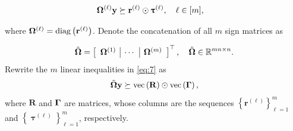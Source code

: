 \documentclass[12pt,draftcls,onecolumn]{IEEEtran}
\begin{document}
\begin{equation}
\label{eq:7}
\begin{aligned}
\bOmega^{(\ell)}\mathbf{y} &\succeq \mathbf{r}^{(\ell)} \odot \boldsymbol{\uptau}^{(\ell)}, \quad \ell \in [m],
\end{aligned}
\end{equation}

where $\boldsymbol{\Omega}^{(\ell)}=\operatorname{diag}\left(\mathbf{r}^{(\ell)}\right)$. 
Denote the concatenation of all $m$ sign matrices as

\begin{equation}
\label{eq:9}
\Tilde{\bOmega}=\left[\begin{array}{c|c|c}
\bOmega^{(1)} &\cdots &\bOmega^{(m)}
\end{array}\right]^{\top}, \quad \Tilde{\bOmega}\in \mathbb{R}^{m n\times n}.
\end{equation}\normalsize
Rewrite the $m$ linear %
inequalities in \eqref{eq:7} as
\begin{equation}
\label{eq:8}
\Tilde{\bOmega} \mathbf{y} \succeq \operatorname{vec}\left(\mbR\right)\odot \operatorname{vec}\left(\bGamma\right),
\end{equation}\normalsize
where $\mathbf{R}$ and $\boldsymbol{\Gamma}$ are matrices, whose columns are the sequences $\left\{\mathbf{r}^{(\ell)}\right\}_{\ell=1}^{m}$ and $\left\{\boldsymbol{\uptau}^{(\ell)}\right\}_{\ell=1}^{m}$, respectively.
\end{document}
